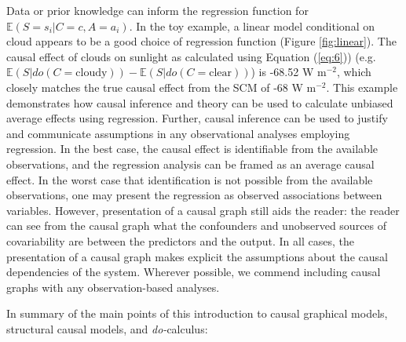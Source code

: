 \documentclass[12pt]{article}
\begin{document}
Data or prior knowledge can inform the regression function for
$\mathbb{E}(S=s_i | C=c, A=a_i)$. In the toy example, a linear model
conditional on cloud appears to be a good choice of regression
function (Figure \ref{fig:linear}). The causal effect of clouds on
sunlight as calculated using Equation (\ref{eq:6})) (e.g.
$\mathbb{E}(S | do(C = \text{cloudy})) - \mathbb{E}(S | do(C =
\text{clear}))$) is -68.52 W m$^{-2}$, which closely matches the true
causal effect from the SCM of -68 W m$^{-2}$. This example
demonstrates how causal inference and theory can be used to calculate
unbiased average effects using regression. Further, causal inference
can be used to justify and communicate assumptions in any
observational analyses employing regression. In the best case, the
causal effect is identifiable from the available observations, and
the regression analysis can be framed as an average causal effect. In
the worst case that identification is not possible from the available
observations, one may present the regression as observed associations
between variables. However, presentation of a causal graph still aids
the reader: the reader can see from the causal graph what the
confounders and unobserved sources of covariability are between the
predictors and the output. In all cases, the presentation of a causal
graph makes explicit the assumptions about the causal dependencies of
the system. Wherever possible, we commend including causal graphs with
any observation-based analyses.

In summary of the main points of this introduction to causal graphical
models, structural causal models, and \textit{do-}calculus:
\end{document}
